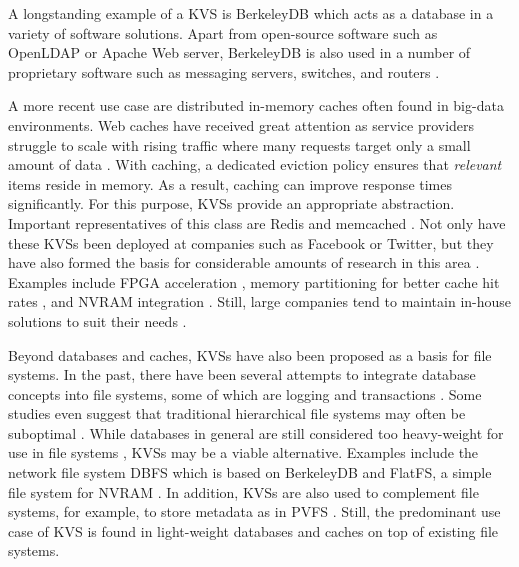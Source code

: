 A longstanding example of a \ac{KVS} is BerkeleyDB which acts as a database in a
variety of software solutions. Apart from open-source software such as OpenLDAP
or Apache Web server, BerkeleyDB is also used in a number of proprietary
software such as messaging servers, switches, and routers
\cite{kaestner2007aspect, olson1999berkeley}.

A more recent use case are distributed in-memory caches often found in big-data
environments. Web caches have received great attention as service providers
struggle to scale with rising traffic where many requests target only a small
amount of data \cite{xu2014characterizing}. With caching, a dedicated eviction
policy ensures that \emph{relevant} items reside in memory. As a result, caching
can improve response times significantly. For this purpose, \acp{KVS} provide an
appropriate abstraction. Important representatives of this class are Redis and
memcached \cite{redis2017home, memcached2017home}. Not only have these \acp{KVS}
been deployed at companies such as Facebook or Twitter, but they have also
formed the basis for considerable amounts of research in this area
\cite{xu2014characterizing}. Examples include \ac{FPGA} acceleration
\cite{lavasani2014fpga}, memory partitioning for better cache hit rates
\cite{carra2014memory}, and \ac{NVRAM} integration \cite{wu2016nvmcached,
malinowski2017using, venkataraman2011consistent}. Still, large companies tend to
maintain in-house solutions to suit their needs \cite{chang2008bigtable,
decandia2007dynamo, lakshman2010cassandra, wang2015hydradb}.

Beyond databases and caches, \acp{KVS} have also been proposed as a basis for
file systems. In the past, there have been several attempts to integrate
database concepts into file systems, some of which are logging
\cite{rosenblum1992design, tweedie1998journaling} and transactions
\cite{seltzer1990transaction, wright2007extending, spillane2009enabling}. Some
studies even suggest that traditional hierarchical file systems may often be
suboptimal \cite{stein2005stupid, seltzer2009hierarchical}. While databases in
general are still considered too heavy-weight for use in file systems
\cite{seltzer2009hierarchical}, \acp{KVS} may be a viable alternative. Examples
include the network file system DBFS which is based on BerkeleyDB
\cite{murphy2002design} and FlatFS, a simple file system for \ac{NVRAM}
\cite{volos2014aerie}. In addition, \acp{KVS} are also used to complement file
systems, for example, to store metadata as in PVFS \cite{carns2009small}. Still,
the predominant use case of \ac{KVS} is found in light-weight databases and
caches on top of existing file systems.

